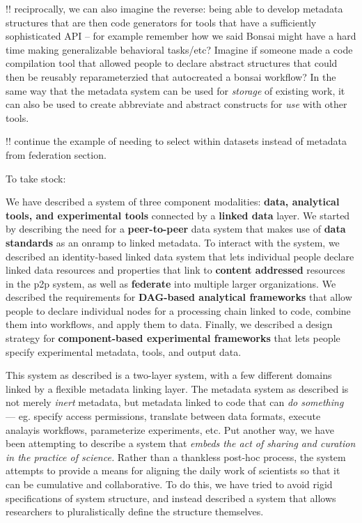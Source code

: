 \documentclass[notoc]{tufte-book}
\begin{document}
!! reciprocally, we can also imagine the reverse: being able to develop
metadata structures that are then code generators for tools that have a
sufficiently sophisticated API -- for example remember how we said
Bonsai might have a hard time making generalizable behavioral tasks/etc?
Imagine if someone made a code compilation tool that allowed people to
declare abstract structures that could then be reusably reparameterzied
that autocreated a bonsai workflow? In the same way that the metadata
system can be used for \emph{storage} of existing work, it can also be
used to create abbreviate and abstract constructs for \emph{use} with
other tools.

!! continue the example of needing to select within datasets instead of
metadata from federation section.

To take stock:

We have described a system of three component modalities: \textbf{data,
analytical tools, and experimental tools} connected by a \textbf{linked
data} layer. We started by describing the need for a
\textbf{peer-to-peer} data system that makes use of \textbf{data
standards} as an onramp to linked metadata. To interact with the system,
we described an identity-based linked data system that lets individual
people declare linked data resources and properties that link to
\textbf{content addressed} resources in the p2p system, as well as
\textbf{federate} into multiple larger organizations. We described the
requirements for \textbf{DAG-based analytical frameworks} that allow
people to declare individual nodes for a processing chain linked to
code, combine them into workflows, and apply them to data. Finally, we
described a design strategy for \textbf{component-based experimental
frameworks} that lets people specify experimental metadata, tools, and
output data.

This system as described is a two-layer system, with a few different
domains linked by a flexible metadata linking layer. The metadata system
as described is not merely \emph{inert} metadata, but metadata linked to
code that can \emph{do something} --- eg. specify access permissions,
translate between data formats, execute analayis workflows, parameterize
experiments, etc. Put another way, we have been attempting to describe a
system that \emph{embeds the act of sharing and curation in the practice
of science.} Rather than a thankless post-hoc process, the system
attempts to provide a means for aligning the daily work of scientists so
that it can be cumulative and collaborative. To do this, we have tried
to avoid rigid specifications of system structure, and instead described
a system that allows researchers to pluralistically define the structure
themselves.
\end{document}
